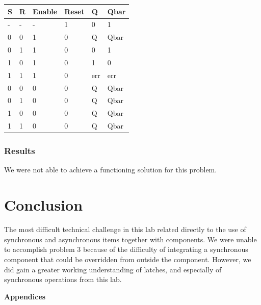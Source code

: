 \documentclass[11pt]{article}
\begin{document}
\begin{table}[H]
\begin{center}
\begin{tabular}{| l | l | l | l | l | l |}
	\hline
	S & R & Enable & Reset & Q & Qbar \\ \hline
	- & - & - & 1 & 0 & 1 \\ \hline
	0 & 0 & 1 & 0 & Q & Qbar \\ \hline
	0 & 1 & 1 & 0 & 0 & 1  \\ \hline
	1 & 0 & 1 & 0 & 1 & 0 \\ \hline
	1 & 1  & 1 & 0 & err & err \\ \hline
	0 & 0 & 0 & 0 & Q & Qbar \\ \hline
	0 & 1 & 0 & 0 & Q & Qbar \\ \hline
	1 & 0 & 0 & 0 & Q & Qbar \\ \hline
	1 & 1 & 0 & 0 & Q & Qbar \\ \hline
\end{tabular}
\end{center}
\end{table}

\subsubsection{Results}
We were not able to achieve a functioning solution for this problem.

\section{Conclusion}
The most difficult technical challenge in this lab related directly to the use of synchronous and asynchronous items together with components. We were unable to accomplish problem 3 because of the difficulty of integrating a synchronous component that could be overridden from outside the component. However, we did gain a greater working understanding of latches, and especially of synchronous operations from this lab.

\pagebreak

\textbf{Appendices}
\end{document}
